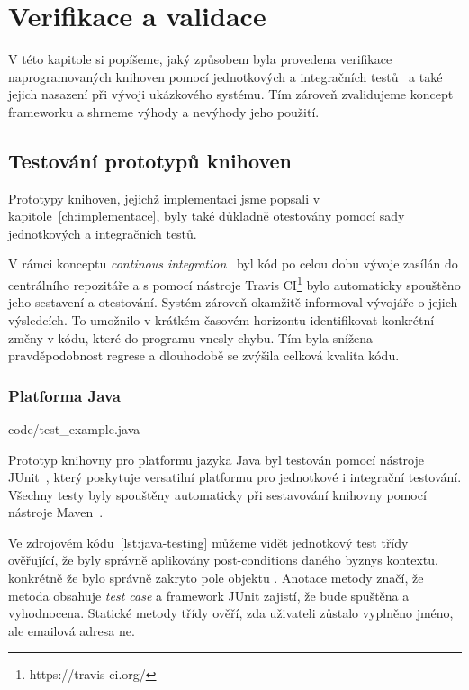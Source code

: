 \usepackage[T1]{fontenc}
\usepackage[utf8]{inputenc}


\chapter{Verifikace a validace}\label{ch:verifikace}

V této kapitole si popíšeme, jaký způsobem byla provedena
verifikace naprogramovaných knihoven pomocí
jednotkových a integračních testů~\cite{luo2001software}
a také jejich nasazení při vývoji ukázkového systému.
Tím zároveň zvalidujeme koncept frameworku a shrneme výhody
a nevýhody jeho použití.

\section{Testování prototypů knihoven}

Prototypy knihoven, jejichž implementaci jsme popsali
v kapitole~\ref{ch:implementace}, byly také důkladně
otestovány pomocí sady jednotkových a integračních testů.

V rámci konceptu \textit{continous integration}~\cite{fowler2006continuous}
byl kód po celou dobu vývoje zasílán do centrálního repozitáře
a s pomocí nástroje Travis CI\footnote{https://travis-ci.org/}
bylo automaticky spouštěno jeho sestavení a otestování. Systém
zároveň okamžitě informoval vývojáře o jejich výsledcích. To
umožnilo v krátkém časovém horizontu identifikovat konkrétní změny
v kódu, které do programu vnesly chybu. Tím byla snížena
pravděpodobnost regrese a dlouhodobě se zvýšila celková kvalita kódu.

\subsection{Platforma Java}


{code/test_example.java}

Prototyp knihovny pro platformu jazyka Java byl testován pomocí
nástroje JUnit~\cite{junit4}, který poskytuje versatilní platformu pro
jednotkové i integrační testování. Všechny testy byly spouštěny automaticky
při sestavování knihovny pomocí nástroje Maven~\cite{maven}.

Ve zdrojovém kódu~\ref{lst:java-testing}
můžeme vidět jednotkový test třídy  ověřující,
že byly správně aplikovány post-conditions daného byznys kontextu, konkrétně
že bylo správně zakryto pole  objektu . Anotace
 metody  značí,
že metoda obsahuje \textit{test case} a framework JUnit zajistí, že bude spuštěna
a vyhodnocena. Statické metody třídy  ověří, zda uživateli zůstalo
vyplněno jméno, ale emailová adresa ne.



